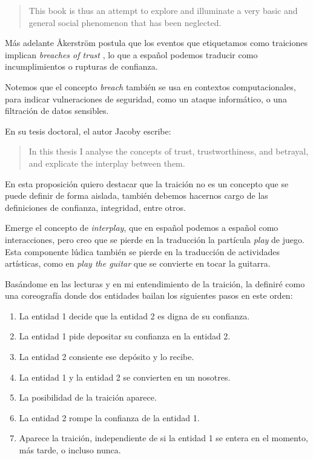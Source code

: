 \documentclass{article}
\begin{document}
\begin{quote}
This book is thus an attempt to explore and illuminate a very basic and general social phenomenon that has been neglected.\cite[p. x]{betrayalBetrayersAkerstrom}

\end{quote}

Más adelante Åkerström postula que los eventos que etiquetamos como traiciones implican \textit{breaches of trust} \cite[p. 1]{betrayalBetrayersAkerstrom}, lo que a español podemos traducir como incumplimientos o rupturas de confianza.

Notemos que el concepto \textit{breach} también se usa en contextos computacionales, para indicar vulneraciones de seguridad, como un ataque informático, o una filtración de datos sensibles.

En su tesis doctoral, el autor Jacoby escribe:

\begin{quote}
In this thesis I analyse the concepts of trust, trustworthiness, and betrayal, and
explicate the interplay between them. \cite[p. 1]{trustBetrayalJacoby}
\end{quote}

En esta proposición quiero destacar que la traición no es un concepto que se puede definir de forma aislada, también debemos hacernos cargo de las definiciones de confianza, integridad, entre otros.

Emerge el concepto de \textit{interplay}, que en español podemos  a español como interacciones, pero creo que se pierde en la traducción la partícula \textit{play} de juego. Esta componente lúdica también se pierde en la traducción de actividades artísticas, como en \textit{play the guitar} que se convierte en tocar la guitarra.

Basándome en las lecturas y en mi entendimiento de la traición, la definiré como una coreografía donde dos entidades bailan los siguientes pasos en este orden:

\begin{enumerate}
    \item La entidad 1 decide que la entidad 2 es digna de su confianza.
    \item La entidad 1 pide depositar su confianza en la entidad 2.
    \item La entidad 2 consiente ese depósito y lo recibe.
    \item La entidad 1 y la entidad 2 se convierten en un nosotres.
    \item La posibilidad de la traición aparece.
    \item La entidad 2 rompe la confianza de la entidad 1.
    \item Aparece la traición, independiente de si la entidad 1 se entera en el momento, más tarde, o incluso nunca.
\end{enumerate}
\end{document}
